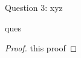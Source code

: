 \begin{solution}{Question 3: xyz}\label{ques:3}
    \begin{question}
    ques
    \end{question}
    \tcblower{}
    \begin{proof}
    this proof
    \end{proof}
\end{solution}
